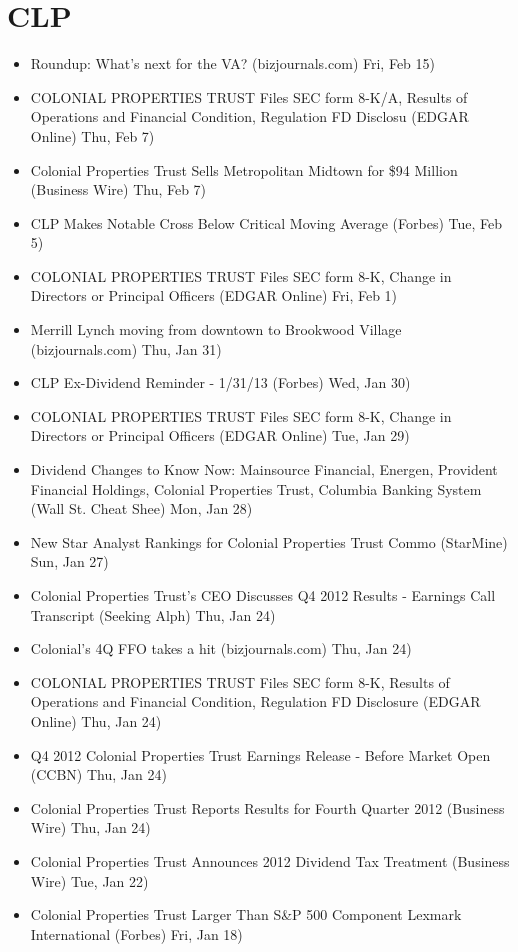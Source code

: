 \documentclass[11pt,asymmetric]{article}
\begin{document}
\section*{CLP}
\begin{itemize}
\item Roundup: What's next for the VA? (bizjournals.com) Fri, Feb 15)
\item COLONIAL PROPERTIES TRUST Files SEC form 8-K/A, Results of Operations and Financial Condition, Regulation FD Disclosu (EDGAR Online) Thu, Feb 7)
\item Colonial Properties Trust Sells Metropolitan Midtown for \$94 Million (Business Wire) Thu, Feb 7)
\item CLP Makes Notable Cross Below Critical Moving Average (Forbes) Tue, Feb 5)
\item COLONIAL PROPERTIES TRUST Files SEC form 8-K, Change in Directors or Principal Officers (EDGAR Online) Fri, Feb 1)
\item Merrill Lynch moving from downtown to Brookwood Village (bizjournals.com) Thu, Jan 31)
\item CLP Ex-Dividend Reminder - 1/31/13 (Forbes) Wed, Jan 30)
\item COLONIAL PROPERTIES TRUST Files SEC form 8-K, Change in Directors or Principal Officers (EDGAR Online) Tue, Jan 29)
\item Dividend Changes to Know Now: Mainsource Financial, Energen, Provident Financial Holdings, Colonial Properties Trust, Columbia Banking System (Wall St. Cheat Shee) Mon, Jan 28)
\item New Star Analyst Rankings for Colonial Properties Trust Commo (StarMine) Sun, Jan 27)
\item Colonial Properties Trust's CEO Discusses Q4 2012 Results - Earnings Call Transcript (Seeking Alph) Thu, Jan 24)
\item Colonial's 4Q FFO takes a hit (bizjournals.com) Thu, Jan 24)
\item COLONIAL PROPERTIES TRUST Files SEC form 8-K, Results of Operations and Financial Condition, Regulation FD Disclosure (EDGAR Online) Thu, Jan 24)
\item Q4 2012 Colonial Properties Trust Earnings Release - Before Market Open (CCBN) Thu, Jan 24)
\item Colonial Properties Trust Reports Results for Fourth Quarter 2012 (Business Wire) Thu, Jan 24)
\item Colonial Properties Trust Announces 2012 Dividend Tax Treatment (Business Wire) Tue, Jan 22)
\item Colonial Properties Trust Larger Than S\&P 500 Component Lexmark International (Forbes) Fri, Jan 18)

\end{itemize}
\end{document}
